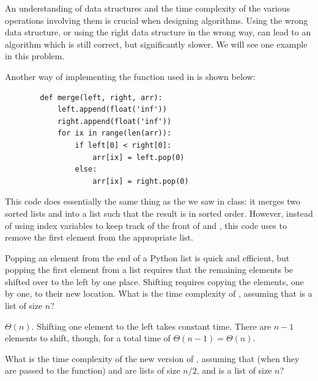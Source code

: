 \begin{prob}
    An understanding of data structures and the time complexity of the various
    operations involving them is crucial when designing algorithms. Using
    the wrong data structure, or using the right data structure in the wrong
    way, can lead to an algorithm which is still correct, but significantly
    slower. We will see one example in this problem.

    Another way of implementing the  function used in
     is shown below:

    \begin{verbatim}
        def merge(left, right, arr):
            left.append(float('inf'))
            right.append(float('inf'))
            for ix in range(len(arr)):
                if left[0] < right[0]:
                    arr[ix] = left.pop(0)
                else:
                    arr[ix] = right.pop(0)
    \end{verbatim}

    This code does essentially the same thing as the  we saw in class:
    it merges two sorted lists  and  into a list
     such that the result is in sorted order. However, instead of
    using index variables to keep track of the front of  and ,
    this code uses  to remove the first element from
    the appropriate list.

    \begin{subprobset}
        \begin{subprob}
            Popping an element from the end of a Python list is quick and
            efficient, but popping the first element from a list requires that
            the remaining elements be shifted over to the left by one place. Shifting
            requires copying the elements, one by one, to their new location.
            What is the time complexity of , assuming that
             is a list of size $n$?

            \begin{soln}
                $\Theta(n)$. Shifting one element to the left takes constant time.
                There are $n-1$ elements to shift, though, for a total time
                of $\Theta(n-1) = \Theta(n)$.
            \end{soln}
        \end{subprob}

        \begin{subprob}
            What is the time complexity of the new version of
            , assuming that (when they are passed to the
            function)  and  are lists of size
            $n/2$, and  is a list of size $n$?


\end{subprob}
\end{subprobset}
\end{prob}

